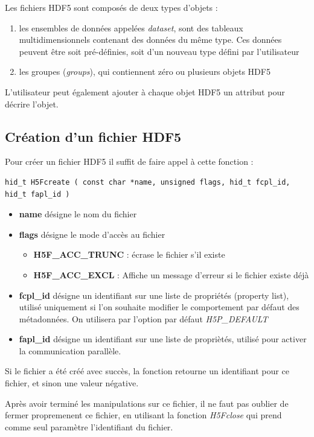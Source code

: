 \documentclass[12pt]{article}
\begin{document}
Les fichiers HDF5 sont composés de deux types d'objets :
\begin{enumerate}
\item les ensembles de données appelées \emph{dataset}, sont des tableaux multidimensionnels contenant des données du même type. Ces données peuvent être soit pré-définies, soit d'un nouveau type défini par l'utilisateur
\item les groupes (\emph{groups}), qui contiennent zéro ou plusieurs objets HDF5
\end{enumerate} 
L'utilisateur peut également ajouter à chaque objet HDF5 un attribut pour décrire l'objet.
\subsection {Création d'un fichier HDF5}
Pour créer un fichier HDF5 il suffit de faire appel à cette fonction :
\begin{verbatim}
hid_t H5Fcreate ( const char *name, unsigned flags, hid_t fcpl_id, hid_t fapl_id )
\end{verbatim}
\begin{itemize}
\item \textbf{name} désigne le nom du fichier
\item \textbf{flags} désigne le mode d'accès au fichier  
    \begin{itemize}
    \item \textbf{H5F\_ACC\_TRUNC} : écrase le fichier s'il existe
    \item \textbf{H5F\_ACC\_EXCL} : Affiche un message d'erreur si le fichier existe déjà  
    \end{itemize}
\item \textbf{fcpl\_id} désigne un identifiant sur une liste de propriétés (property list), utilisé uniquement si l'on souhaite modifier le comportement par défaut des métadonnées. On utilisera par l'option par défaut \emph{H5P\_DEFAULT}
\item \textbf{fapl\_id} désigne un identifiant sur une liste de propriètés, utilisé pour activer la communication parallèle.
\end{itemize}
Si le fichier a été créé avec succès, la fonction retourne un identifiant pour ce fichier, et sinon une valeur négative.\newline

Après avoir terminé les manipulations sur ce fichier, il ne faut pas oublier de fermer propremenent ce fichier, en utilisant la fonction \emph{H5Fclose} qui prend comme seul paramètre l'identifiant du fichier.
\newpage
\end{document}
